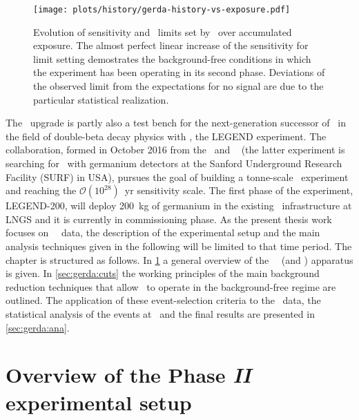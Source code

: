 \begin{figure}
  \centering
  \texttt{[image: plots/history/gerda-history-vs-exposure.pdf]}
  \caption{%
    Evolution of sensitivity and \thalfzero\ limits set by \gerda\ over accumulated
    exposure. The almost perfect linear increase of the sensitivity for limit setting
    demostrates the background-free conditions in which the experiment has been operating
    in its second phase. Deviations of the observed limit from the expectations for no
    signal are due to the particular statistical realization.
  }\label{img:exp:gerda-history}
\end{figure}
\newpar
The \phasetwop\ upgrade is partly also a test bench for the next-generation successor of
\gerda\ in the field of double-beta decay physics with \gesix, the LEGEND experiment. The
collaboration, formed in October 2016 from the \gerda\ and \majorana~\cite{Abgrall2014}
(the latter experiment is searching for \onbb\ with germanium detectors at the Sanford
Underground Research Facility (SURF) in USA), pursues the goal of building a tonne-scale
\gesix\ experiment and reaching the $\mathcal{O}(10^{28})$~yr sensitivity scale. The first
phase of the experiment, LEGEND-200, will deploy 200~kg of germanium in the existing \gerda\
infrastructure at LNGS and it is currently in commissioning phase.
\newpar
As the present thesis work focuses on \gerda\ \phasetwo\ data, the description of the
experimental setup and the main analysis techniques given in the following will be limited
to that time period. The chapter is structured as follows. In \cref{sec:gerda:setup} a
general overview of the \gerda\ \phasetwo\ (and \phasetwop) apparatus is given. In
\cref{sec:gerda:cuts} the working principles of the main background reduction techniques
that allow \gerda\ to operate in the background-free regime are outlined. The application
of these event-selection criteria to the \phasetwo\ data, the statistical analysis of the
events at \qbb\ and the final results are presented in \cref{sec:gerda:ana}.

\section{Overview of the Phase {\normalfont\textit{II}} experimental setup}%
\label{sec:gerda:setup}


